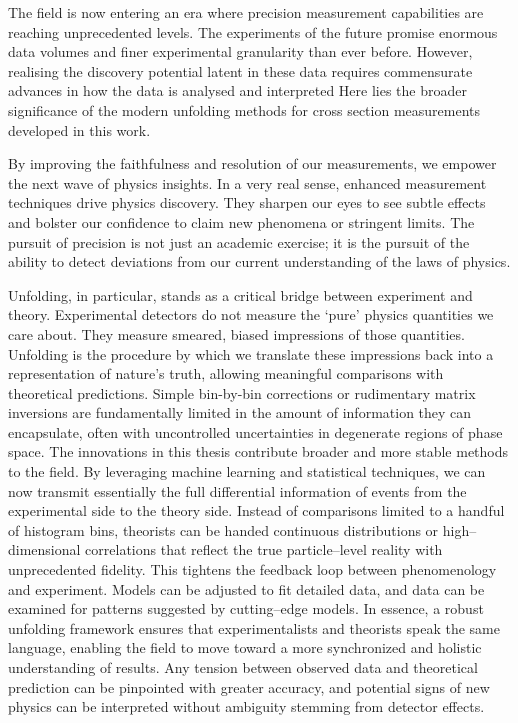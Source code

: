     The field is now entering an era where precision measurement capabilities are reaching unprecedented levels.
    The experiments of the future promise enormous data volumes and finer experimental granularity than ever before.
    However, realising the discovery potential latent in these data requires commensurate advances in how the data is analysed and interpreted
    Here lies the broader significance of the modern unfolding methods for cross section measurements developed in this work.
    
    By improving the faithfulness and resolution of our measurements, we empower the next wave of physics insights.
    In a very real sense, enhanced measurement techniques drive physics discovery.
    They sharpen our eyes to see subtle effects and bolster our confidence to claim new phenomena or stringent limits.
    The pursuit of precision is not just an academic exercise; it is the pursuit of the ability to detect deviations from our current understanding of the laws of physics.
                
    Unfolding, in particular, stands as a critical bridge between experiment and theory.
    Experimental detectors do not measure the `pure' physics quantities we care about.
    They measure smeared, biased impressions of those quantities.
    Unfolding is the procedure by which we translate these impressions back into a representation of nature's truth, allowing meaningful comparisons with theoretical predictions.
    Simple bin-by-bin corrections or rudimentary matrix inversions are fundamentally limited in the amount of information they can encapsulate, often with uncontrolled uncertainties in degenerate regions of phase space.
    The innovations in this thesis contribute broader and more stable methods to the field.
    By leveraging machine learning and statistical techniques, we can now transmit essentially the full differential information of events from the experimental side to the theory side.
    Instead of comparisons limited to a handful of histogram bins, theorists can be handed continuous distributions or high--dimensional correlations that reflect the true particle--level reality with unprecedented fidelity.
    This tightens the feedback loop between phenomenology and experiment.
    Models can be adjusted to fit detailed data, and data can be examined for patterns suggested by cutting--edge models.
    In essence, a robust unfolding framework ensures that experimentalists and theorists speak the same language, enabling the field to move toward a more synchronized and holistic understanding of results.
    Any tension between observed data and theoretical prediction can be pinpointed with greater accuracy, and potential signs of new physics can be interpreted without ambiguity stemming from detector effects.
                
